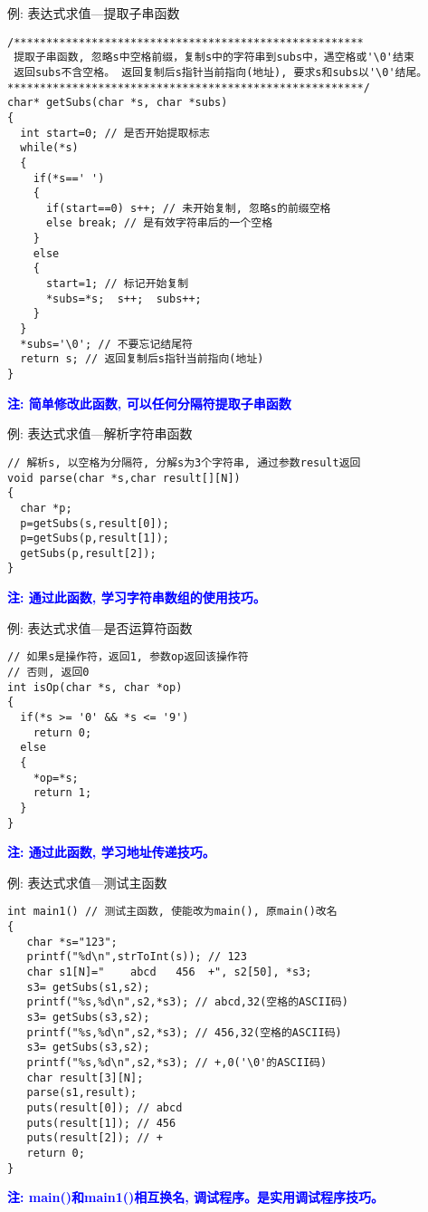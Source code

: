 \begin{frame}{例: 表达式求值---提取子串函数}
\vspace{-0.5cm}
\begin{lstlisting}
/******************************************************
 提取子串函数, 忽略s中空格前缀，复制s中的字符串到subs中，遇空格或'\0'结束
 返回subs不含空格。 返回复制后s指针当前指向(地址), 要求s和subs以'\0'结尾。
*******************************************************/ 
char* getSubs(char *s, char *subs) 
{
  int start=0; // 是否开始提取标志
  while(*s)
  {
    if(*s==' ') 
    {
      if(start==0) s++; // 未开始复制, 忽略s的前缀空格 
      else break; // 是有效字符串后的一个空格 
    }
    else
    {
      start=1; // 标记开始复制 
      *subs=*s;  s++;  subs++;
    }
  }
  *subs='\0'; // 不要忘记结尾符 
  return s; // 返回复制后s指针当前指向(地址)
}
\end{lstlisting}
\textbf{\textcolor{blue}{注: 简单修改此函数, 可以任何分隔符提取子串函数}}
\end{frame}

\begin{frame}{例: 表达式求值---解析字符串函数}
\begin{lstlisting}
// 解析s, 以空格为分隔符, 分解s为3个字符串, 通过参数result返回
void parse(char *s,char result[][N])
{
  char *p;
  p=getSubs(s,result[0]);
  p=getSubs(p,result[1]);
  getSubs(p,result[2]);
} 
\end{lstlisting}
\textbf{\textcolor{blue}{注: 通过此函数, 学习字符串数组的使用技巧。}}
\end{frame}

\begin{frame}{例: 表达式求值---是否运算符函数}
\begin{lstlisting}
// 如果s是操作符，返回1, 参数op返回该操作符
// 否则, 返回0 
int isOp(char *s, char *op)
{
  if(*s >= '0' && *s <= '9') 
    return 0;
  else
  {
    *op=*s;
    return 1;
  }
} 
\end{lstlisting}
\textbf{\textcolor{blue}{注: 通过此函数, 学习地址传递技巧。}}
\end{frame}

\begin{frame}{例: 表达式求值---测试主函数}
\vspace{-0.3cm}
\begin{lstlisting}
int main1() // 测试主函数, 使能改为main(), 原main()改名
{
   char *s="123";
   printf("%d\n",strToInt(s)); // 123
   char s1[N]="    abcd   456  +", s2[50], *s3;
   s3= getSubs(s1,s2);
   printf("%s,%d\n",s2,*s3); // abcd,32(空格的ASCII码) 
   s3= getSubs(s3,s2);
   printf("%s,%d\n",s2,*s3); // 456,32(空格的ASCII码) 
   s3= getSubs(s3,s2);  
   printf("%s,%d\n",s2,*s3); // +,0('\0'的ASCII码)
   char result[3][N];
   parse(s1,result);
   puts(result[0]); // abcd
   puts(result[1]); // 456
   puts(result[2]); // +
   return 0;
}
\end{lstlisting}
\textbf{\textcolor{blue}{注: main()和main1()相互换名, 调试程序。是实用调试程序技巧。}}
\end{frame}

